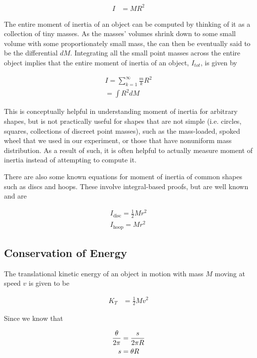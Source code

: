\documentclass[coverpage]{article}
\begin{document}
	\begin{align}
		I&=M R^2 \label{eq:def-i}
	\end{align}

	The entire moment of inertia of an object can be computed by thinking of it as a collection of tiny masses. As the masses' volumes shrink down to some small volume with some proportionately small mass, the can then be eventually said to be the differential $dM$. Integrating all the small point masses across the entire object implies that the entire moment of inertia of an object, $I_{tot}$, is given by
	
	\begin{align}
		I=\sum_{k=1}^{\infty}{\frac{m}{k}R^2}\\
		=\int{R^2dM}
	\end{align}

	This is conceptually helpful in understanding moment of inertia for arbitrary shapes, but is not practically useful for shapes that are not simple (i.e. circles, squares, collections of discreet point masses), such as the mass-loaded, spoked wheel that we used in our experiment, or those that have nonuniform mass distribution. As a result of such, it is often helpful to actually measure moment of inertia instead of attempting to compute it.
	
	There are also some known equations for moment of inertia of common shapes such as discs and hoops. These involve integral-based proofs, but are well known and are
	
	\begin{align}
		I_{\text{disc}} = \frac{1}{2} M r^2 \\
		I_{\text{hoop}} = M r^2
	\end{align}
	
	\subsection{Conservation of Energy}
	
	The translational kinetic energy of an object in motion with mass $M$ moving at speed $v$ is given to be
	
	\begin{align}
		K_T&=\frac{1}{2}Mv^2 \label{eq:translational-kinetic}
	\end{align}

	Since we know that
	
	\begin{align}
		\frac{\theta}{2\pi}&=\frac{s}{2\pi R} \notag \\
		s&=\theta R
	\end{align}
\end{document}
